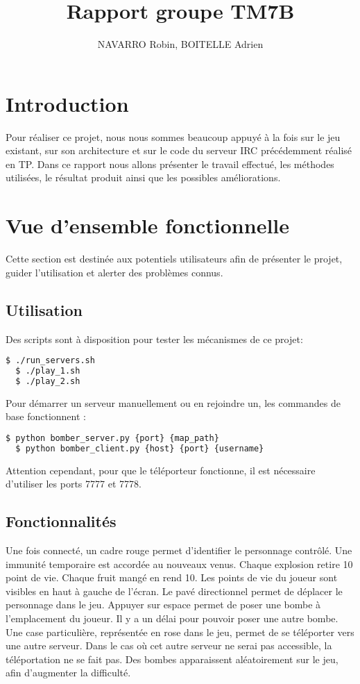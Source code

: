 \documentclass[12pt]{article}
\title{Rapport groupe TM7B}
\author{NAVARRO Robin, BOITELLE Adrien}
\begin{document}
\maketitle

\newpage
\tableofcontents
\newpage

\section{Introduction}
Pour réaliser ce projet, nous nous sommes beaucoup appuyé à la fois sur le jeu existant, sur son architecture et sur le code du serveur IRC précédemment réalisé en TP. Dans ce rapport nous allons présenter le travail effectué, les méthodes utilisées, le résultat produit ainsi que les possibles améliorations.

\section{Vue d'ensemble fonctionnelle}

Cette section est destinée aux potentiels utilisateurs afin de présenter le projet, guider l'utilisation et alerter des problèmes connus.

\subsection{Utilisation}

Des scripts sont à disposition pour tester les mécanismes de ce projet:
\begin{lstlisting}[language=bash]
  $ ./run_servers.sh
  $ ./play_1.sh
  $ ./play_2.sh
\end{lstlisting}

Pour démarrer un serveur manuellement ou en rejoindre un, les commandes de base fonctionnent : 
\begin{lstlisting}[language=bash]
  $ python bomber_server.py {port} {map_path}
  $ python bomber_client.py {host} {port} {username}
\end{lstlisting}

Attention cependant, pour que le téléporteur fonctionne, il est nécessaire d'utiliser les ports 7777 et 7778.
\subsection{Fonctionnalités}
Une fois connecté, un cadre rouge permet d'identifier le personnage contrôlé. Une immunité temporaire est accordée au nouveaux venus. Chaque explosion retire 10 point de vie. Chaque fruit mangé en rend 10. Les points de vie du joueur sont visibles en haut à gauche de l'écran. Le pavé directionnel permet de déplacer le personnage dans le jeu. Appuyer sur espace permet de poser une bombe à l'emplacement du joueur. Il y a un délai pour pouvoir poser une autre bombe.
Une case particulière, représentée en rose dans le jeu, permet de se téléporter vers une autre serveur.
Dans le cas où cet autre serveur ne serai pas accessible, la téléportation ne se fait pas.
Des bombes apparaissent aléatoirement sur le jeu, afin d'augmenter la difficulté.
\end{document}
